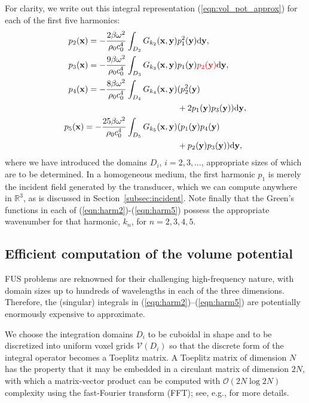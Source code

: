 \documentclass[preprint]{JASA}
\newcommand{\sd}{\mbox{d}}
\newcommand{\bx}{\mathbf{x}}
\newcommand{\by}{\mathbf{y}}
\newcommand{\red}[1]{{\color{red} #1}}
\begin{document}
For clarity, we write out this integral representation (\ref{eqn:vol_pot_approx})
for each of the first five harmonics:
\begin{align}
    \label{eqn:harm2} p_2(\bx) = -\frac{2\beta \omega^2}{\rho_0 c_0^4}
                    \int_{D_2}G_{k_2}(\bx,\by)&p_1^2(\by)\sd \by, \\
        \label{eqn:harm3} p_3(\bx) = -\frac{9\beta \omega^2}{\rho_0 c_0^4}
                    \int_{D_3}G_{k_3}(\bx,\by)&p_1(\by) \red{p_2(\by)}\sd \by, \\
        \label{eqn:harm4} p_4(\bx) = -\frac{8\beta \omega^2}{\rho_0 c_0^4}
        \int_{D_4}G_{k_4}(\bx,\by)&(p_2^2(\by) \\
                                  &+ 2p_1(\by)p_3(\by))\sd \by, \\
        \nonumber
        p_5(\bx) = -\frac{25\beta \omega^2}{\rho_0 c_0^4}
        \int_{D_5}G_{k_5}(\bx,\by)&(p_1(\by)p_4(\by) \\
        \label{eqn:harm5}  & + p_2(\by)p_3(\by))\sd \by, 
\end{align}
where we have introduced the domains $D_i$, $i=2,3,\ldots$, appropriate sizes 
of which are to be determined. In a homogeneous medium, the first harmonic $p_1$ 
is merely the incident field generated by the transducer, which we can compute 
anywhere in $\mathbb{R}^3$, \red{as is discussed in Section~\ref{subsec:incident}}. Note finally that the Green's functions in each of 
(\ref{eqn:harm2})-(\ref{eqn:harm5}) possess the appropriate wavenumber for that 
harmonic, $k_n$, for $n=2, 3, 4, 5$.


\subsection{Efficient computation of the volume potential}
\label{ss:compute_potential}
\red{FUS} problems are reknowned for their challenging high-frequency nature, with 
domain sizes up to hundreds of wavelengths in each of the three dimensions. 
Therefore, the (singular) integrals in (\ref{eqn:harm2})--(\ref{eqn:harm5}) are 
potentially enormously expensive to approximate. 

We choose the integration domains $D_i$ to be cuboidal in shape and to be 
discretized into uniform voxel grids 
$\mathcal{V}(D_i)$ so that the 
discrete form of the integral operator becomes a Toeplitz matrix. A Toeplitz 
matrix of dimension $N$ has the property that it may be embedded in a circulant 
matrix of dimension $2N$, with which a matrix-vector product can be computed 
with $\mathcal{O}(2N\log 2N)$ complexity using the fast-Fourier transform (FFT);
see, e.g., \cite{groth2020accelerating} for more details.
\end{document}
